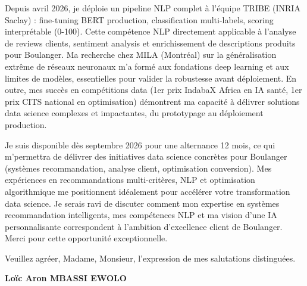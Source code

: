 \documentclass[a4paper,11pt]{article}
\begin{document}
\vspace{0.8em}
\noindent Depuis avril 2026, je déploie un pipeline NLP complet à l'équipe TRIBE (INRIA Saclay) : fine-tuning BERT production, classification multi-labels, scoring interprétable (0-100). Cette compétence NLP directement applicable à l'analyse de reviews clients, sentiment analysis et enrichissement de descriptions produits pour Boulanger. Ma recherche chez MILA (Montréal) sur la généralisation extrême de réseaux neuronaux m'a formé aux fondations deep learning et aux limites de modèles, essentielles pour valider la robustesse avant déploiement. En outre, mes succès en compétitions data (1er prix IndabaX Africa en IA santé, 1er prix CITS national en optimisation) démontrent ma capacité à délivrer solutions data science complexes et impactantes, du prototypage au déploiement production.

\vspace{0.8em}
\noindent Je suis disponible dès septembre 2026 pour une alternance 12 mois, ce qui m'permettra de délivrer des initiatives data science concrètes pour Boulanger (systèmes recommandation, analyse client, optimisation conversion). Mes expériences en recommandations multi-critères, NLP et optimisation algorithmique me positionnent idéalement pour accélérer votre transformation data science. Je serais ravi de discuter comment mon expertise en systèmes recommandation intelligents, mes compétences NLP et ma vision d'une IA personnalisante correspondent à l'ambition d'excellence client de Boulanger. Merci pour cette opportunité exceptionnelle.

\vspace{1.5em}
\noindent Veuillez agr\'eer, Madame, Monsieur, l'expression de mes salutations distingu\'ees.

\vspace{2em}
\noindent \textbf{Lo\"ic Aron MBASSI EWOLO}
\end{document}
